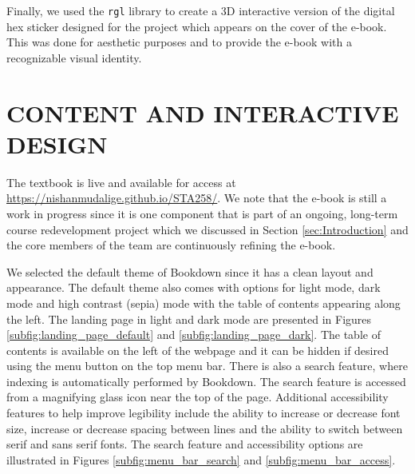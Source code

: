 \documentclass[11pt]{article}
\begin{document}
Finally, we used the \texttt{rgl} library to create a 3D interactive version of the digital hex sticker designed for the project which appears on the cover of the e-book.
This was done for aesthetic purposes and to provide the e-book with a recognizable visual identity.


\section{CONTENT AND INTERACTIVE DESIGN}

The textbook is live and available for access at \href{https://nishanmudalige.github.io/STA258/}{https://nishanmudalige.github.io/STA258/}.
We note that the e-book is still a work in progress since it is one component that is part of an ongoing, long-term course redevelopment project which we discussed in Section \ref{sec:Introduction} and the core members of the team are continuously refining the e-book.

We selected the default theme of Bookdown since it has a clean layout and appearance.
The default theme also comes with options for light mode, dark mode and high contrast (sepia) mode with the table of contents appearing along the left.
The landing page in light and dark mode are presented in Figures \ref{subfig:landing_page_default} and \ref{subfig:landing_page_dark}.
The table of contents is available on the left of the webpage and it can be hidden if desired using the menu button on the top menu bar.
There is also a search feature, where indexing is automatically performed by Bookdown. The search feature is accessed from a magnifying glass icon near the top of the page.
Additional accessibility features to help improve legibility include the ability to increase or decrease font size, increase or decrease spacing between lines and the ability to switch between serif and sans serif fonts. The search feature and accessibility options are illustrated in Figures \ref{subfig:menu_bar_search} and \ref{subfig:menu_bar_access}.
\end{document}
